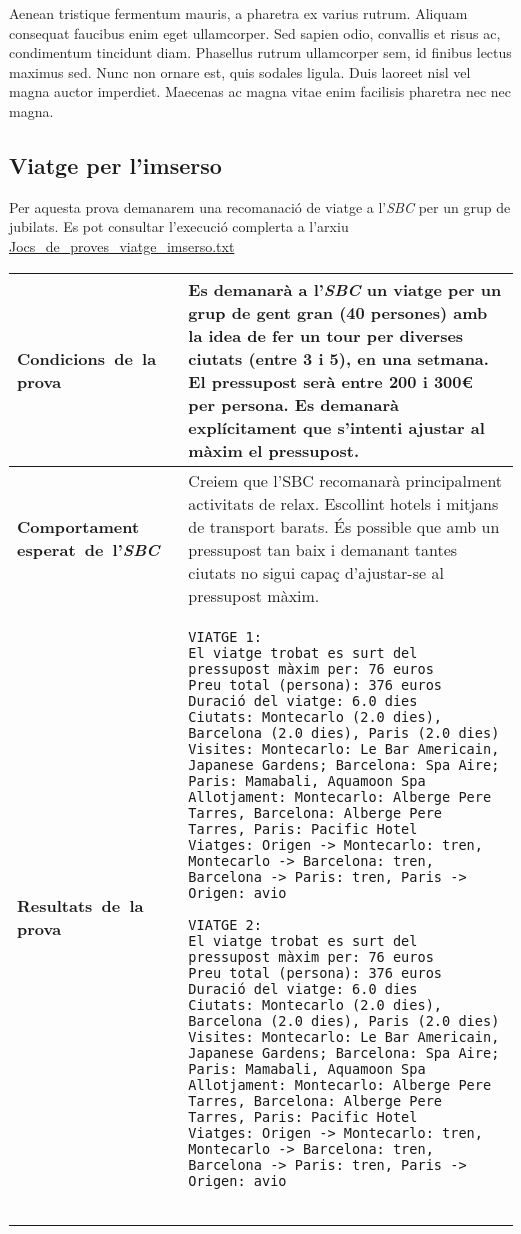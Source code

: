 \documentclass[11pt,a4paper]{article}
\begin{document}
Aenean tristique fermentum mauris, a pharetra ex varius rutrum. Aliquam consequat faucibus enim eget ullamcorper. Sed sapien odio, convallis et risus ac, condimentum tincidunt diam. Phasellus rutrum ullamcorper sem, id finibus lectus maximus sed. Nunc non ornare est, quis sodales ligula. Duis laoreet nisl vel magna auctor imperdiet. Maecenas ac magna vitae enim facilisis pharetra nec nec magna.

\subsection{Viatge per l'imserso}
Per aquesta prova demanarem una recomanació de viatge a l'\emph{SBC} per un grup de jubilats. Es pot consultar l'execució complerta a l'arxiu \url{Jocs_de_proves_viatge_imserso.txt} \\

\noindent
\begin{tabular}{|p{}|p{}|}
\hline
\textbf{\mbox{Condicions de la} \mbox{prova}} & Es demanarà a l'\emph{SBC} un viatge per un grup de gent gran (40 persones) amb la idea de fer un tour per diverses ciutats (entre 3 i 5), en una setmana. El pressupost serà entre 200 i 300\euro{} per persona. Es demanarà explícitament que s'intenti ajustar al màxim el pressupost.\\
\hline
\textbf{Comportament \mbox{esperat de l'\emph{SBC}}} & Creiem que l'SBC recomanarà principalment activitats de relax. Escollint hotels i mitjans de transport barats. És possible que amb un pressupost tan baix i demanant tantes ciutats no sigui capaç d'ajustar-se al pressupost màxim.\\
\hline
\textbf{\mbox{Resultats de la} \mbox{prova}} & \begin{verbatim}VIATGE 1:
El viatge trobat es surt del pressupost màxim per: 76 euros
Preu total (persona): 376 euros
Duració del viatge: 6.0 dies
Ciutats: Montecarlo (2.0 dies), Barcelona (2.0 dies), Paris (2.0 dies)
Visites: Montecarlo: Le Bar Americain, Japanese Gardens; Barcelona: Spa Aire; Paris: Mamabali, Aquamoon Spa
Allotjament: Montecarlo: Alberge Pere Tarres, Barcelona: Alberge Pere Tarres, Paris: Pacific Hotel
Viatges: Origen -> Montecarlo: tren, Montecarlo -> Barcelona: tren, Barcelona -> Paris: tren, Paris -> Origen: avio

VIATGE 2:
El viatge trobat es surt del pressupost màxim per: 76 euros
Preu total (persona): 376 euros
Duració del viatge: 6.0 dies
Ciutats: Montecarlo (2.0 dies), Barcelona (2.0 dies), Paris (2.0 dies)
Visites: Montecarlo: Le Bar Americain, Japanese Gardens; Barcelona: Spa Aire; Paris: Mamabali, Aquamoon Spa
Allotjament: Montecarlo: Alberge Pere Tarres, Barcelona: Alberge Pere Tarres, Paris: Pacific Hotel
Viatges: Origen -> Montecarlo: tren, Montecarlo -> Barcelona: tren, Barcelona -> Paris: tren, Paris -> Origen: avio


\end{verbatim} \\
\hline
\end{tabular}
\medskip
\end{document}
